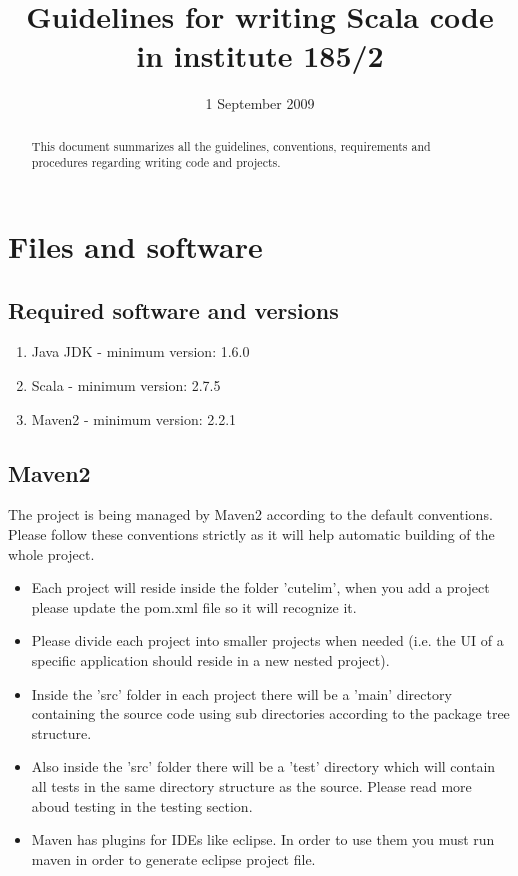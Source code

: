 \documentclass[a4paper, 11pt]{article}
\title{Guidelines for writing Scala code in institute 185/2}
\date{1 September 2009}
\begin{document}
\maketitle

\begin{abstract}

\noindent This document summarizes all the guidelines, conventions, requirements and procedures regarding writing code and projects.
\end{abstract}

\section{Files and software}
\subsection{Required software and versions}
\begin{enumerate}
 \item Java JDK - minimum version: 1.6.0
 \item Scala - minimum version: 2.7.5
 \item Maven2 - minimum version: 2.2.1
\end{enumerate}

\subsection{Maven2}
The project is being managed by Maven2 according to the default conventions. Please follow these conventions strictly as it will help automatic building of the whole project.
\begin{itemize}
 \item Each project will reside inside the folder 'cutelim', when you add a project please update the pom.xml file so it will recognize it.
 \item Please divide each project into smaller projects when needed (i.e. the UI of a specific application should reside in a new nested project).
 \item Inside the 'src' folder in each project there will be a 'main' directory containing the source code using sub directories according to the package tree structure.
 \item Also inside the 'src' folder there will be a 'test' directory which will contain all tests in the same directory structure as the source. Please read more aboud testing in the testing section.
 \item Maven has plugins for IDEs like eclipse. In order to use them you must run maven in order to generate eclipse project file.
\end{itemize}
\end{document}
